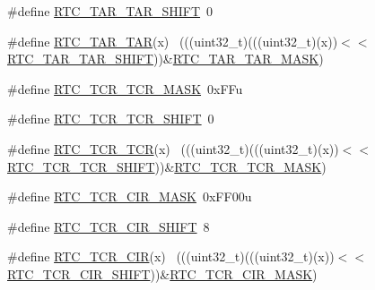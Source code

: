 \begin{DoxyCompactItemize}
\item 
\#define \hyperlink{group___r_t_c___register___masks_ga9ec8791d91dc36f0f59a7705988f7278}{R\+T\+C\+\_\+\+T\+A\+R\+\_\+\+T\+A\+R\+\_\+\+S\+H\+I\+FT}~0
\item 
\#define \hyperlink{group___r_t_c___register___masks_ga817df24c688f5b9031ce69c919c9337f}{R\+T\+C\+\_\+\+T\+A\+R\+\_\+\+T\+AR}(x)                                                  ~(((uint32\+\_\+t)(((uint32\+\_\+t)(x))$<$$<$\hyperlink{group___r_t_c___register___masks_ga9ec8791d91dc36f0f59a7705988f7278}{R\+T\+C\+\_\+\+T\+A\+R\+\_\+\+T\+A\+R\+\_\+\+S\+H\+I\+FT}))\&\hyperlink{group___r_t_c___register___masks_ga649a76416ad00079054bd866565dada2}{R\+T\+C\+\_\+\+T\+A\+R\+\_\+\+T\+A\+R\+\_\+\+M\+A\+SK})
\item 
\#define \hyperlink{group___r_t_c___register___masks_ga48a96d1de8db1993bfac3ca9d6bdb227}{R\+T\+C\+\_\+\+T\+C\+R\+\_\+\+T\+C\+R\+\_\+\+M\+A\+SK}~0x\+F\+Fu
\item 
\#define \hyperlink{group___r_t_c___register___masks_ga0d8bc8c79b8010b8ebb94562428713fe}{R\+T\+C\+\_\+\+T\+C\+R\+\_\+\+T\+C\+R\+\_\+\+S\+H\+I\+FT}~0
\item 
\#define \hyperlink{group___r_t_c___register___masks_gae677a99c22f7ba8c9c872446e4d8dc09}{R\+T\+C\+\_\+\+T\+C\+R\+\_\+\+T\+CR}(x)                                                  ~(((uint32\+\_\+t)(((uint32\+\_\+t)(x))$<$$<$\hyperlink{group___r_t_c___register___masks_ga0d8bc8c79b8010b8ebb94562428713fe}{R\+T\+C\+\_\+\+T\+C\+R\+\_\+\+T\+C\+R\+\_\+\+S\+H\+I\+FT}))\&\hyperlink{group___r_t_c___register___masks_ga48a96d1de8db1993bfac3ca9d6bdb227}{R\+T\+C\+\_\+\+T\+C\+R\+\_\+\+T\+C\+R\+\_\+\+M\+A\+SK})
\item 
\#define \hyperlink{group___r_t_c___register___masks_ga8f198d1dbc7427e1dfabdc4e9f53f8e2}{R\+T\+C\+\_\+\+T\+C\+R\+\_\+\+C\+I\+R\+\_\+\+M\+A\+SK}~0x\+F\+F00u
\item 
\#define \hyperlink{group___r_t_c___register___masks_ga4b8c9ecf8ed798b8c0173ce122874c5e}{R\+T\+C\+\_\+\+T\+C\+R\+\_\+\+C\+I\+R\+\_\+\+S\+H\+I\+FT}~8
\item 
\#define \hyperlink{group___r_t_c___register___masks_gaa25059e7519bf8e6316b66836be1cb18}{R\+T\+C\+\_\+\+T\+C\+R\+\_\+\+C\+IR}(x)                                                  ~(((uint32\+\_\+t)(((uint32\+\_\+t)(x))$<$$<$\hyperlink{group___r_t_c___register___masks_ga4b8c9ecf8ed798b8c0173ce122874c5e}{R\+T\+C\+\_\+\+T\+C\+R\+\_\+\+C\+I\+R\+\_\+\+S\+H\+I\+FT}))\&\hyperlink{group___r_t_c___register___masks_ga8f198d1dbc7427e1dfabdc4e9f53f8e2}{R\+T\+C\+\_\+\+T\+C\+R\+\_\+\+C\+I\+R\+\_\+\+M\+A\+SK})
$$
\end{DoxyCompactItemize}
